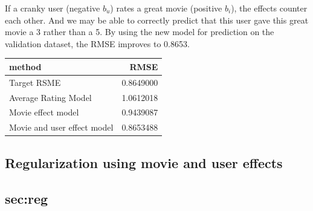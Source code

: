 \documentclass[]{article}
\newenvironment{Shaded}{\begin{snugshade}}{\end{snugshade}}
\newcommand{\CommentTok}[1]{\textcolor[rgb]{0.56,0.35,0.01}{\textit{#1}}}
\newcommand{\DataTypeTok}[1]{\textcolor[rgb]{0.13,0.29,0.53}{#1}}
\newcommand{\KeywordTok}[1]{\textcolor[rgb]{0.13,0.29,0.53}{\textbf{#1}}}
\newcommand{\NormalTok}[1]{#1}
\newcommand{\OperatorTok}[1]{\textcolor[rgb]{0.81,0.36,0.00}{\textbf{#1}}}
\newcommand{\StringTok}[1]{\textcolor[rgb]{0.31,0.60,0.02}{#1}}
\begin{document}
If a cranky user (negative \(b_{u}\)) rates a great movie (positive
\(b_{i}\)), the effects counter each other. And we may be able to
correctly predict that this user gave this great movie a 3 rather than a
5. By using the new model for prediction on the validation dataset, the
RMSE improves to 0.8653.

\begin{Shaded}
\end{Shaded}

\begin{longtable}[]{@{}lr@{}}
\toprule
method & RMSE\tabularnewline
\midrule
\endhead
Target RSME & 0.8649000\tabularnewline
Average Rating Model & 1.0612018\tabularnewline
Movie effect model & 0.9439087\tabularnewline
Movie and user effect model & 0.8653488\tabularnewline
\bottomrule
\end{longtable}

\subsection{Regularization using movie and user effects}
\subsection{sec:reg}
\end{document}
